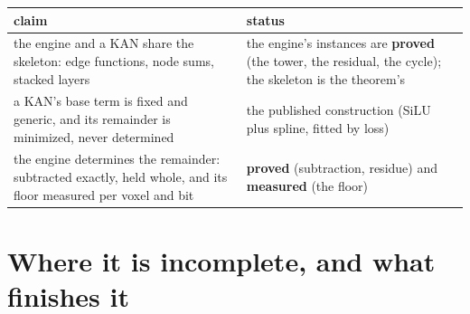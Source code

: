 {\small
\setlength{\tabcolsep}{6pt}
\begin{longtable}{>{\RaggedRight\arraybackslash}p{}>{\RaggedRight\arraybackslash}p{}}
\toprule
claim & status \\
\midrule
\endhead
the engine and a KAN share the skeleton: edge functions, node sums, stacked layers & the engine's instances are \textbf{proved} (the tower, the residual, the cycle); the skeleton is the theorem's \\
a KAN's base term is fixed and generic, and its remainder is minimized, never determined & the published construction (SiLU plus spline, fitted by loss) \\
the engine determines the remainder: subtracted exactly, held whole, and its floor measured per voxel and bit & \textbf{proved} (subtraction, residue) and \textbf{measured} (the floor) \\
\bottomrule
\end{longtable}
}

\section{\texorpdfstring{Where it is incomplete, and what finishes it}{Where it is incomplete, and what finishes it}}

